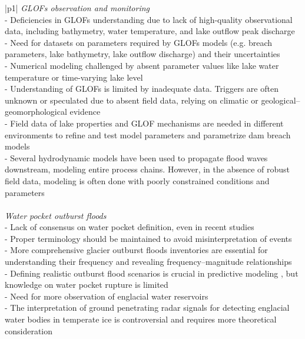 \begin{center}
\begin{longtable}{|p{}|}
\textit{GLOFs observation and monitoring} \\
\hline
- Deficiencies in GLOFs understanding due to lack of high-quality observational data, including bathymetry, water temperature, and lake outflow peak discharge {\citep{Roberts2005,Huss&al2007}} \\
- Need for datasets on parameters required by GLOFs models (e.g. breach parameters, lake bathymetry, lake outflow discharge) and their uncertainties {\citep{Emmer&al2022,Zhang&al2024}} \\
- Numerical modeling challenged by absent parameter values like lake water temperature or time-varying lake level {\citep{Carrivick&al2020,Zhang&al2024}} \\
- Understanding of GLOFs is limited by inadequate data. Triggers are often unknown or speculated due to absent field data, relying on climatic or geological–geomorphological evidence {\citep{Zhang&al2024}} \\
- Field data of lake properties and GLOF mechanisms are needed in different environments to refine and test model parameters and parametrize dam breach models {\citep{Zhang&al2024}} \\
- Several hydrodynamic models have been used to propagate flood waves downstream, modeling entire process chains. However, in the absence of robust field data, modeling is often done with poorly constrained conditions and parameters {\citep{Zhang&al2024}} \\
\\
\textit{Water pocket outburst floods} \\
\hline
- Lack of consensus on water pocket definition, even in recent studies {\citep[e.g. in]{Lutzow&al2023,Zhang&al2024}} \\
- Proper terminology should be maintained to avoid misinterpretation of events {\citep{Emmer&al2022}} \\
- More comprehensive glacier outburst floods inventories are essential for understanding their frequency and revealing frequency–magnitude relationships {\citep{Veh&al2022,Emmer&al2022}} \\
- Defining realistic outburst flood scenarios is crucial in predictive modeling {\citep{Emmer&al2022,Zhang&al2024}}, but knowledge on water pocket rupture is limited {\citep{Haeberli1983}} \\
- Need for more observation of englacial water reservoirs {\citep{Haeberli1983}} \\
- The interpretation of ground penetrating radar signals for detecting englacial water bodies in temperate ice is controversial and requires more theoretical consideration {\citep{Murray&al2000,Brown&al2009}} \\

\end{longtable}
\end{center}
